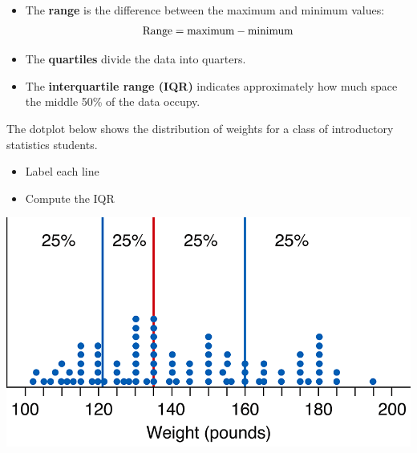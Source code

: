 \documentclass[../mathNotesPreamble]{subfiles}
\begin{document}
  \begin{defn*}
    \begin{itemize}
      \item The \textbf{range} is the difference between the maximum and minimum values:
        \[\textnormal{Range}=\textnormal{maximum}-\textnormal{minimum}\]
      \item The \textbf{quartiles} divide the data into quarters.
      \item The \textbf{interquartile range (IQR)} indicates approximately how much space the middle 50\% of the data occupy.
    \end{itemize}
  \end{defn*}
  \begin{ex*}
    The dotplot below shows the distribution of weights for a class of introductory statistics students.
    \begin{itemize}
      \item Label each line
      \item Compute the IQR
    \end{itemize}
  \end{ex*}
  \begin{center}
    \includegraphics[width=0.7\linewidth]{images/math211_figure_3p18}
  \end{center}
  \pagebreak
  
\end{document}
